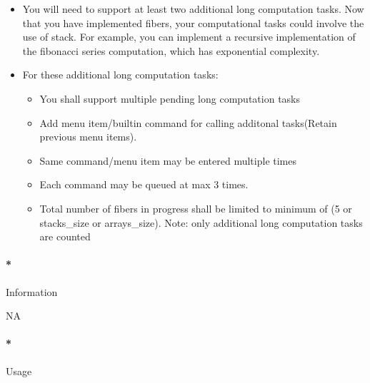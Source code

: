 \documentclass[]{article}
\providecommand{\tightlist}{%
  \setlength{\itemsep}{0pt}\setlength{\parskip}{0pt}}
\let\oldparagraph\paragraph
\renewcommand{\paragraph}[1]{\oldparagraph{#1}\mbox{}}
\begin{document}
\begin{itemize}
\tightlist
\item
  You will need to support at least two additional long computation
  tasks. Now that you have implemented fibers, your computational tasks
  could involve the use of stack. For example, you can implement a
  recursive implementation of the fibonacci series computation, which
  has exponential complexity.
\item
  For these additional long computation tasks:

  \begin{itemize}
  \tightlist
  \item
    You shall support multiple pending long computation tasks
  \item
    Add menu item/builtin command for calling additonal tasks(Retain
    previous menu items).
  \item
    Same command/menu item may be entered multiple times
  \item
    Each command may be queued at max 3 times.
  \item
    Total number of fibers in progress shall be limited to minimum of (5
    or stacks\_size or arrays\_size). Note: only additional long
    computation tasks are counted
  \end{itemize}
\end{itemize}

\paragraph*{Information}\label{information-6}

NA

\paragraph*{Usage}\label{usage-6}
\end{document}
